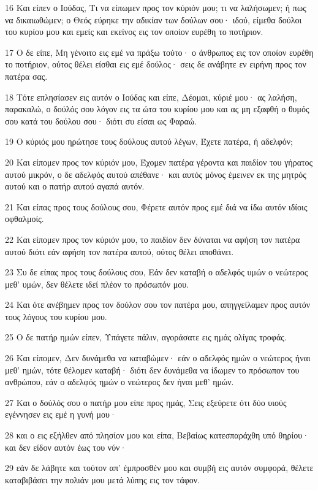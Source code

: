 \par 16 Και είπεν ο Ιούδας, Τι να είπωμεν προς τον κύριόν μου; τι να λαλήσωμεν; ή πως να δικαιωθώμεν; ο Θεός εύρηκε την αδικίαν των δούλων σου· ιδού, είμεθα δούλοι του κυρίου μου και εμείς και εκείνος εις τον οποίον ευρέθη το ποτήριον.
\par 17 Ο δε είπε, Μη γένοιτο εις εμέ να πράξω τούτο· ο άνθρωπος εις τον οποίον ευρέθη το ποτήριον, ούτος θέλει είσθαι εις εμέ δούλος· σεις δε ανάβητε εν ειρήνη προς τον πατέρα σας.
\par 18 Τότε επλησίασεν εις αυτόν ο Ιούδας και είπε, Δέομαι, κύριέ μου· ας λαλήση, παρακαλώ, ο δούλός σου λόγον εις τα ώτα του κυρίου μου και ας μη εξαφθή ο θυμός σου κατά του δούλου σου· διότι συ είσαι ως Φαραώ.
\par 19 Ο κύριός μου ηρώτησε τους δούλους αυτού λέγων, Έχετε πατέρα, ή αδελφόν;
\par 20 Και είπομεν προς τον κύριόν μου, Έχομεν πατέρα γέροντα και παιδίον του γήρατος αυτού μικρόν, ο δε αδελφός αυτού απέθανε· και αυτός μόνος έμεινεν εκ της μητρός αυτού και ο πατήρ αυτού αγαπά αυτόν.
\par 21 Και είπας προς τους δούλους σου, Φέρετε αυτόν προς εμέ διά να ίδω αυτόν ιδίοις οφθαλμοίς.
\par 22 Και είπομεν προς τον κύριόν μου, το παιδίον δεν δύναται να αφήση τον πατέρα αυτού διότι εάν αφήση τον πατέρα αυτού, ούτος θέλει αποθάνει.
\par 23 Συ δε είπας προς τους δούλους σου, Εάν δεν καταβή ο αδελφός υμών ο νεώτερος μεθ' υμών, δεν θέλετε ιδεί πλέον το πρόσωπόν μου.
\par 24 Και ότε ανέβημεν προς τον δούλον σου τον πατέρα μου, απηγγείλαμεν προς αυτόν τους λόγους του κυρίου μου.
\par 25 Ο δε πατήρ ημών είπεν, Υπάγετε πάλιν, αγοράσατε εις ημάς ολίγας τροφάς.
\par 26 Και είπομεν, Δεν δυνάμεθα να καταβώμεν· εάν ο αδελφός ημών ο νεώτερος ήναι μεθ' ημών, τότε θέλομεν καταβή· διότι δεν δυνάμεθα να ίδωμεν το πρόσωπον του ανθρώπου, εάν ο αδελφός ημών ο νεώτερος δεν ήναι μεθ' ημών.
\par 27 Και ο δούλός σου ο πατήρ μου είπε προς ημάς, Σεις εξεύρετε ότι δύο υιούς εγέννησεν εις εμέ η γυνή μου·
\par 28 και ο εις εξήλθεν από πλησίον μου και είπα, Βεβαίως κατεσπαράχθη υπό θηρίου· και δεν είδον αυτόν έως του νύν·
\par 29 εάν δε λάβητε και τούτον απ' έμπροσθέν μου και συμβή εις αυτόν συμφορά, θέλετε καταβιβάσει την πολιάν μου μετά λύπης εις τον τάφον.
